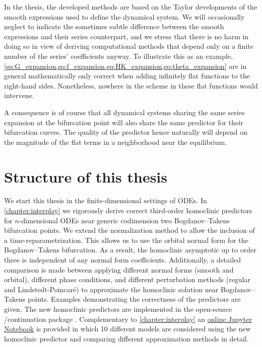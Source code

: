 \begin{remark}
In the thesis, the developed methods are based on the Taylor developments of
the smooth expressions used to define the dynamical system. We will
occasionally neglect to indicate the sometimes subtle difference between the
smooth expressions and their series counterpart, and we stress that there is no
harm in doing so in view of deriving computational methods that depend only on
a finite number of the series' coefficients anyway. To illustrate this as an
example,
\cref{eq:G_expansion,eq:f_expansion,eq:HK_expansion,eq:theta_expansion} are in
general mathematically only correct when adding infinitely flat functions to
the right-hand sides.  Nonetheless, nowhere in the scheme in
\label{fig:coefficients} these flat functions would intervene.

A consequence is of course that all dynamical systems sharing the same series
expansion at the bifurcation point will also share the same predictor for their
bifurcation curves.  The quality of the predictor hence naturally will depend
on the magnitude of the flat terms in a neighborhood near the equilibrium.
\end{remark}

\section{Structure of this thesis}
We start this thesis in the finite-dimensional settings of ODEs. In
\cref{chapter:interplay} we rigorously derive correct third-order homoclinic
predictors for $n$-dimensional ODEs near generic codimension two Bogdanov--Takens
bifurcation points. We extend the normalization method to allow the inclusion of
a time-reparametrization. This allows us to use the orbital normal form for the
Bogdanov--Takens bifurcation. As a result, the homoclinic asymptotic up to order
three is independent of any normal form coefficients. Additionally, a detailed
comparison is made between applying different normal forms (smooth and orbital),
different phase conditions, and different perturbation methods (regular and
Lindstedt-Poincar\'e) to approximate the homoclinic solution near
Bogdanov--Takens points.  Examples demonstrating the correctness of the
predictors are given. The new homoclinic predictors are implemented in the
open-source \MATLAB/\OCTAVE continuation package \MATCONT. Complementary to
\cref{chapter:interplay} an
\href{https://mmbosschaert.github.io/MatCont7p2NewInitBTHom-/}{online Jupyter
Notebook} is provided in which 10 different models are considered using the new
homoclinic predictor and comparing different approximation methods in detail.

